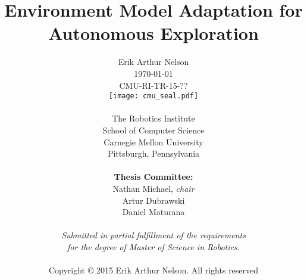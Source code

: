 \author{
        Erik Arthur Nelson \\
        \today \\
        CMU-RI-TR-15-??
  \\
        \texttt{[image: cmu\_seal.pdf]}
  \\
  \\
        The Robotics Institute \\
        School of Computer Science \\
        Carnegie Mellon University \\
        Pittsburgh, Pennsylvania \\
  \\
        {\bf Thesis Committee:} \\
        Nathan Michael, {\it chair} \\
        Artur Dubrawski \\
        Daniel Maturana \\
  \\
        \textit{Submitted in partial fulfillment of the requirements} \\
        \textit{for the degree of Master of Science in Robotics.} \\
  \\
        Copyright \copyright \hspace{2pt} 2015 Erik Arthur Nelson. All rights reserved
}

\title{\bf{
  Environment Model Adaptation for Autonomous Exploration
}}

\date{}
